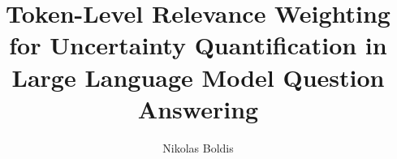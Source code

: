 \documentclass[a4paper,oneside,10pt,ngerman,english]{scrbook}
\begin{document}
\frontmatter


\title{Token-Level Relevance Weighting for Uncertainty Quantification in Large Language Model Question Answering}



\author{Nikolas Boldis }



\end{document}
